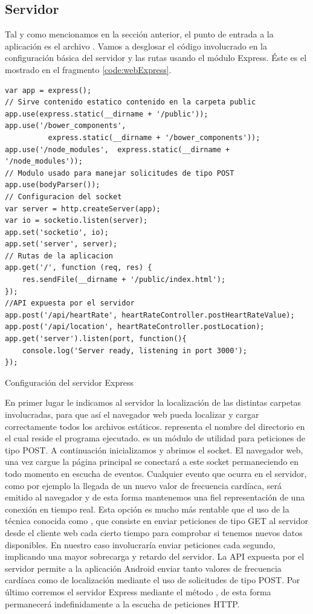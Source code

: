 \subsection{Servidor}
\label{cap:Servidor}
Tal y como mencionamos en la sección anterior, el punto de entrada a la aplicación es el archivo . Vamos a desglosar el código involucrado en la configuración básica del servidor y las rutas usando el módulo Express. Éste es el mostrado en el fragmento \ref{code:webExpress}.

\begin{listing}[h] 
\begin{verbatim}
var app = express();
// Sirve contenido estatico contenido en la carpeta public
app.use(express.static(__dirname + '/public'));
app.use('/bower_components', 
          express.static(__dirname + '/bower_components'));
app.use('/node_modules',  express.static(__dirname + '/node_modules'));
// Modulo usado para manejar solicitudes de tipo POST
app.use(bodyParser());
// Configuracion del socket
var server = http.createServer(app);
var io = socketio.listen(server);
app.set('socketio', io);
app.set('server', server);
// Rutas de la aplicacion
app.get('/', function (req, res) {
	res.sendFile(__dirname + '/public/index.html');
});
//API expuesta por el servidor
app.post('/api/heartRate', heartRateController.postHeartRateValue);
app.post('/api/location', heartRateController.postLocation);
app.get('server').listen(port, function(){
	console.log('Server ready, listening in port 3000');
});
\end{verbatim}
\caption{Configuración del servidor Express}
\label{code:webExpress}
\end{listing}

En primer lugar le indicamos al servidor la localización de las distintas carpetas involucradas, para que así el navegador web pueda localizar y cargar correctamente todos los archivos estáticos.  representa el nombre del directorio en el cual reside el programa ejecutado.
 es un módulo de utilidad para peticiones de tipo POST.
A continuación inicializamos y abrimos el socket. El navegador web, una vez cargue la página principal se conectará a este socket permaneciendo en todo momento en escucha de eventos. Cualquier evento que ocurra en el servidor, como por ejemplo la llegada de un nuevo valor de frecuencia cardíaca, será emitido al navegador y de esta forma mantenemos una fiel representación de una conexión en tiempo real. Esta opción es mucho más rentable que el uso de la técnica conocida como , que consiste en enviar peticiones de tipo GET al servidor desde el cliente web cada cierto tiempo para comprobar si tenemos nuevos datos disponibles. En nuestro caso involucraría enviar peticiones cada segundo, implicando una mayor sobrecarga y retardo del servidor.
La API expuesta por el servidor permite a la aplicación Android enviar tanto valores de frecuencia cardíaca como de localización mediante el uso de solicitudes de tipo POST.
Por último corremos el servidor Express mediante el método , de esta forma permanecerá indefinidamente a la escucha de peticiones HTTP.

